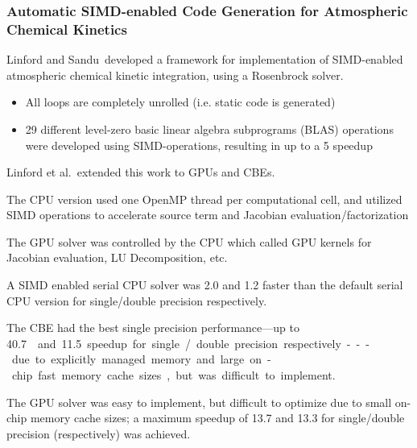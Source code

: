 \documentclass{beamer}
\newcounter{dummynote1}%
\newcounter{dummynote2}%
\begin{document}
\begin{frame}
 \frametitle{Automatic SIMD-enabled Code Generation for Atmospheric Chemical Kinetics}
 \setcounter{dummynote1}{\value{footnote}}
 \setcounter{dummynote2}{\value{footnote}}
 \addtocounter{dummynote1}{1}
 \addtocounter{dummynote2}{2}
 {
  Linford and Sandu\footnotemark[\value{dummynote1}]~developed a framework for implementation of SIMD-enabled atmospheric chemical kinetic integration, using a Rosenbrock solver.
 \begin{itemize}
  \item All loops are completely unrolled (i.e. static code is generated)
  \item 29 different level-zero basic linear algebra subprograms (BLAS) operations were developed using SIMD-operations, resulting in up to a \SI{5}{\times} speedup
 \end{itemize}
 }
 Linford et al.\footnotemark[\value{dummynote2}]~extended this work to GPUs and CBEs.
 \begin{itemize}
  {
  \item The CPU version used one OpenMP thread per computational cell, and utilized SIMD operations to accelerate source term and Jacobian evaluation\slash factorization
  \item The GPU solver was controlled by the CPU which called GPU kernels for Jacobian evaluation, LU Decomposition, etc.
  }
  {
  \item<2-> A SIMD enabled serial CPU solver was \SI{2.0}{\times} and \SI{1.2}{\times} faster than the default serial CPU version for single\slash double precision respectively.
  \item<2-> The CBE had the best single precision performance---up to \SI{40.7}\times and \SI{11.5}{\times} speedup for single\slash double precision respectively---due to explicitly managed memory and large on-chip fast memory cache sizes, but was difficult to implement.
  \item<2-> The GPU solver was easy to implement, but difficult to optimize due to small on-chip memory cache sizes; a maximum speedup of \SI{13.7}{\times} and \SI{13.3}{\times} for single\slash double precision (respectively) was achieved.
  }
 \end{itemize}
 {
 }
 \setcounter{footnote}{\value{dummynote2}} %

\end{frame}
\end{document}
